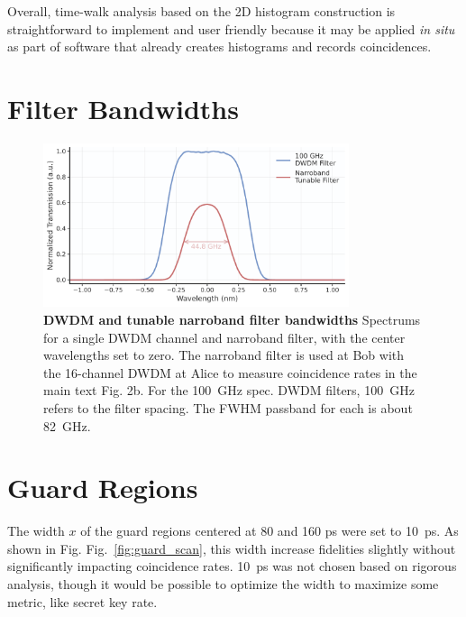 \documentclass[11pt]{caltech_thesis} %
\begin{document}
Overall, time-walk analysis based on the 2D histogram construction is straightforward to implement and user friendly because it may be applied \textit{in situ} as part of software that already creates histograms and records coincidences.

\hypertarget{filter-bandwidths}{%
\section{Filter Bandwidths}\label{filter-bandwidths}}

\hypertarget{fig:bandwidths}{%
\begin{figure}[!htb]
\centering
\includegraphics[width=0.8\textwidth,height=\textheight]{./chapter_05/figs/filter_comparison_light.pdf}
\caption[{DWDM and tunable narroband filter bandwidths}]{\textbf{DWDM and tunable narroband filter bandwidths} Spectrums for a single DWDM channel and narroband filter, with the center wavelengths set to zero. The narroband filter is used at Bob with the 16-channel DWDM at Alice to measure coincidence rates in the main text Fig. 2b. For the 100~GHz spec. DWDM filters, 100~GHz refers to the filter spacing. The FWHM passband for each is about 82~GHz.}
\label{fig:bandwidths}
\end{figure}
}

\hypertarget{guard-regions}{%
\section{Guard Regions}\label{guard-regions}}

The width $x$ of the guard regions centered at 80 and 160 ps were set to 10~ps. As shown in Fig. Fig.~\ref{fig:guard_scan}, this width increase fidelities slightly without significantly impacting coincidence rates. 10~ps was not chosen based on rigorous analysis, though it would be possible to optimize the width to maximize some metric, like secret key rate.
\end{document}
